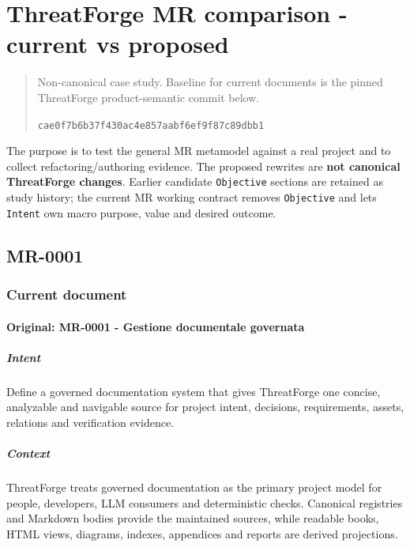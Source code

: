 \documentclass[
  10pt,
]{article}
\author{}
\date{}
\begin{document}
\section{ThreatForge MR comparison - current vs
proposed}\label{threatforge-mr-comparison---current-vs-proposed}

\begin{quote}
Non-canonical case study. Baseline for current documents is the pinned
ThreatForge product-semantic commit below.

\texttt{cae0f7b6b37f430ac4e857aabf6ef9f87c89dbb1}
\end{quote}

The purpose is to test the general MR metamodel against a real project
and to collect refactoring/authoring evidence. The proposed rewrites are
\textbf{not canonical ThreatForge changes}. Earlier candidate
\texttt{Objective} sections are retained as study history; the current
MR working contract removes \texttt{Objective} and lets \texttt{Intent}
own macro purpose, value and desired outcome.

\subsection{MR-0001}\label{mr-0001}

\subsubsection{Current document}\label{current-document}

\paragraph{Original: MR-0001 - Gestione documentale
governata}\label{original-mr-0001---gestione-documentale-governata}

\subparagraph{Intent}\label{intent}

Define a governed documentation system that gives ThreatForge one
concise, analyzable and navigable source for project intent, decisions,
requirements, assets, relations and verification evidence.

\subparagraph{Context}\label{context}

ThreatForge treats governed documentation as the primary project model
for people, developers, LLM consumers and deterministic checks.
Canonical registries and Markdown bodies provide the maintained sources,
while readable books, HTML views, diagrams, indexes, appendices and
reports are derived projections.
\end{document}
